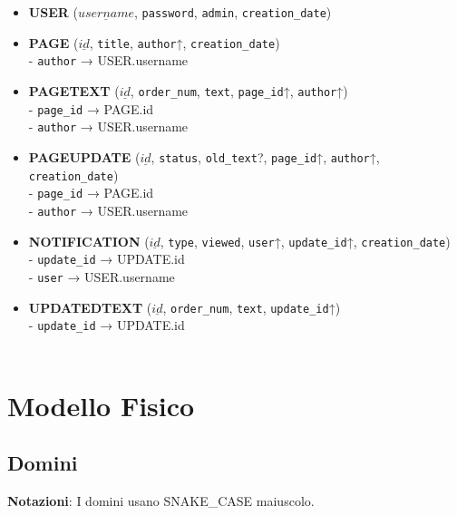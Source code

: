 \documentclass{article}
\begin{document}
	\begin{itemize}
		\item \textbf{USER} ($\underline{username}$, \texttt{password}, \texttt{admin}, \texttt{creation\_date})
		
		\item \textbf{PAGE} ($\underline{id}$, \texttt{title}, \texttt{author}↑, \texttt{creation\_date})
		\\
		- \texttt{author} → USER.username
		
		\item \textbf{PAGETEXT} ($\underline{id}$, \texttt{order\_num}, \texttt{text}, \texttt{page\_id}↑, \texttt{author}↑)
		\\
		- \texttt{page\_id} → PAGE.id	
		\\
		- \texttt{author} → USER.username
		
		\item \textbf{PAGEUPDATE} ($\underline{id}$, \texttt{status}, \texttt{old\_text}?, \texttt{page\_id}↑, \texttt{author}↑, \texttt{creation\_date})
		\\
		- \texttt{page\_id} → PAGE.id
		\\
		- \texttt{author} → USER.username
		
		\item \textbf{NOTIFICATION} ($\underline{id}$, \texttt{type}, \texttt{viewed}, \texttt{user}↑, \texttt{update\_id}↑, \texttt{creation\_date})
		\\
		- \texttt{update\_id} → UPDATE.id
		\\
		- \texttt{user} → USER.username
		
		\item \textbf{UPDATEDTEXT} ($\underline{id}$, \texttt{order\_num}, \texttt{text}, \texttt{update\_id}↑)
		\\
		- \texttt{update\_id} → UPDATE.id
		\\\\
	\end{itemize}
	
	
	\newpage
	
	\section{Modello Fisico}
	\subsection{Domini}
	\textbf{Notazioni}: I domini usano SNAKE\_CASE maiuscolo.
	\\
		
\end{document}
